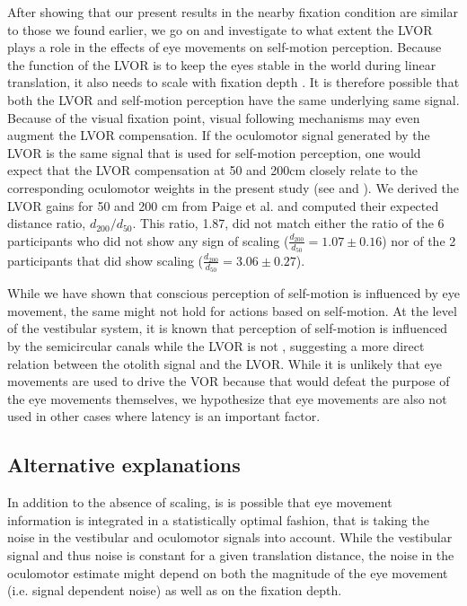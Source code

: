 After showing that our present results in the nearby fixation condition are similar to those we found earlier, we go on and investigate to what extent the LVOR plays a role in the effects of eye movements on self-motion perception. Because the function of the LVOR is to keep the eyes stable in the world during linear translation, it also needs to scale with fixation depth \cite{paige1989, busettini1994,paige1998}. It is therefore possible that both the LVOR and self-motion perception have the same underlying same signal. Because of the visual fixation point, visual following mechanisms may even augment the LVOR compensation. If the oculomotor signal generated by the LVOR is the same signal that is used for self-motion perception, one would expect that the LVOR compensation at 50 and 200cm closely relate to the corresponding oculomotor weights in the present study (see  and ). We derived the LVOR gains for 50 and 200 \si{\centi\metre} from Paige et al. \citeyear{1989} and computed their expected distance ratio, $d_{200} / d_{50}$. This ratio, 1.87, did not match either the ratio of the 6 participants who did not show any sign of scaling ($\frac{d_{200}}{d_{50}} = 1.07 \pm 0.16$) nor of the 2 participants that did show scaling ($\frac{d_{200}}{d_{50}} = 3.06 \pm 0.27$).

While we have shown that conscious perception of self-motion is influenced by eye movement, the same might not hold for actions based on self-motion. At the level of the vestibular system, it is known that perception of self-motion is influenced by the semicircular canals while the LVOR is not \cite{merfeld2005}, suggesting a more direct relation between the otolith signal and the LVOR. While it is unlikely that eye movements are used to drive the VOR because that would defeat the purpose of the eye movements themselves, we hypothesize that eye movements are also not used in other cases where latency is an important factor.


\subsection{Alternative explanations}

In addition to the absence of scaling, is is possible that eye movement information is integrated in a statistically optimal fashion, that is taking the noise in the vestibular and oculomotor signals into account. While the vestibular signal and thus noise is constant for a given translation distance, the noise in the oculomotor estimate might depend on both the magnitude of the eye movement (i.e. signal dependent noise) as well as on the  fixation depth.

